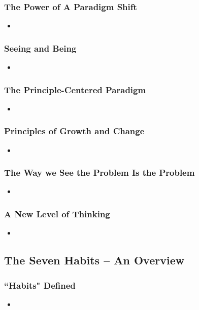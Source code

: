 \documentclass[11pt]{article}
\begin{document}
\subsubsection{The Power of A Paradigm Shift}
\begin{itemize}
\item 
\end{itemize}
\subsubsection{Seeing and Being}
\begin{itemize}
\item 
\end{itemize}
\subsubsection{The Principle-Centered Paradigm}
\begin{itemize}
\item 
\end{itemize}
\subsubsection{Principles of Growth and Change}
\begin{itemize}
\item 
\end{itemize}
\subsubsection{The Way we See the Problem Is the Problem}
\begin{itemize}
\item 
\end{itemize}
\subsubsection{A New Level of Thinking}
\begin{itemize}
\item 
\end{itemize}
\subsection{The Seven Habits -- An Overview}
\subsubsection{``Habits" Defined}
\begin{itemize}
\item 
\end{itemize}
\end{document}
